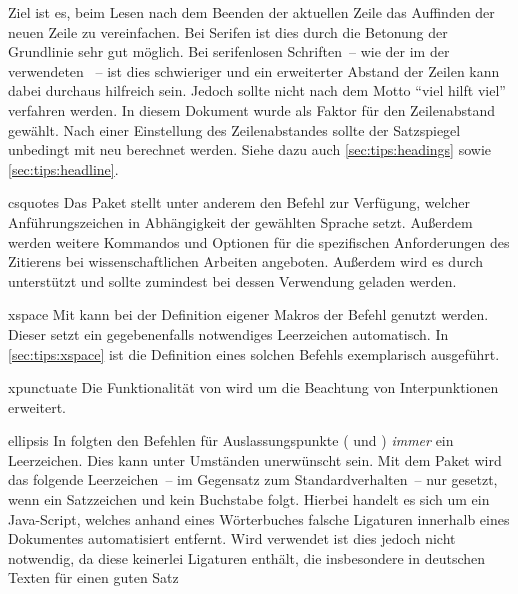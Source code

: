 \begin{packages}
  Ziel ist es, beim Lesen nach dem Beenden der aktuellen Zeile das Auffinden 
  der neuen Zeile zu vereinfachen. Bei Serifen ist dies durch die Betonung der 
  Grundlinie sehr gut möglich. Bei serifenlosen Schriften~-- wie der im \CD der 
  \TnUD verwendeten \Univers~-- ist dies schwieriger und ein erweiterter 
  Abstand der   Zeilen kann dabei durchaus hilfreich sein. Jedoch sollte nicht 
  nach dem Motto \enquote{viel hilft viel} verfahren werden. In diesem Dokument 
  wurde als Faktor für den Zeilenabstand  
  gewählt. Nach einer Einstellung des Zeilenabstandes sollte der Satzspiegel 
  unbedingt mit  neu berechnet werden. Siehe dazu auch 
  \autoref{sec:tips:headings} sowie \autoref{sec:tips:headline}.
\item[csquotes]
  Das Paket stellt unter anderem den Befehl  
  zur Verfügung, welcher Anführungszeichen in Abhängigkeit der gewählten 
  Sprache setzt. Außerdem werden weitere Kommandos und Optionen für die 
  spezifischen Anforderungen des Zitierens bei wissenschaftlichen Arbeiten 
  angeboten. Außerdem wird es durch  unterstützt und sollte 
  zumindest bei dessen Verwendung geladen werden.
\item[xspace]
  Mit  kann bei der Definition eigener Makros der Befehl 
   genutzt werden. Dieser setzt ein gegebenenfalls notwendiges 
  Leerzeichen automatisch. In \autoref{sec:tips:xspace} ist die Definition 
  eines solchen Befehls exemplarisch ausgeführt.
\item[xpunctuate]
  Die Funktionalität von  wird um die Beachtung von 
  Interpunktionen erweitert.
\item[ellipsis]
  In  folgten den Befehlen für Auslassungspunkte ( 
  und ) \emph{immer} ein Leerzeichen. Dies kann unter 
  Umständen unerwünscht sein. Mit dem Paket  wird das 
  folgende Leerzeichen~-- im Gegensatz zum Standardverhalten~-- nur gesetzt, 
  wenn ein Satzzeichen und kein Buchstabe folgt.
  Hierbei handelt es sich um ein Java-Script, welches anhand eines Wörterbuches 
  falsche Ligaturen innerhalb eines Dokumentes automatisiert entfernt. Wird 
  \Univers verwendet ist dies jedoch nicht notwendig, da diese keinerlei 
  Ligaturen enthält, die insbesondere in deutschen Texten für einen guten Satz 

\end{packages}
